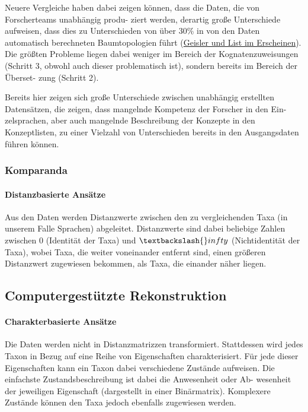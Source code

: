 Neuere Vergleiche haben dabei zeigen können, dass die Daten, die von
Forscherteams unabhängig produ- ziert werden, derartig große
Unterschiede aufweisen, dass dies zu Unterschieden von über 30\% in von
den Daten automatisch berechneten Baumtopologien führt
(\href{http://lingulist.de/jump.php?paper=Geisler2014\&href=documents/beautiful_trees.pdf}{Geisler
und List im Erscheinen}). Die größten Probleme liegen dabei weniger im
Bereich der Kognatenzuweisungen (Schritt 3, obwohl auch dieser
problematisch ist), sondern bereits im Bereich der Überset- zung
(Schritt 2).





Bereits hier zeigen sich große Unterschiede zwischen unabhängig
erstellten Datensätzen, die zeigen, dass mangelnde Kompetenz der
Forscher in den Ein- zelsprachen, aber auch mangelnde Beschreibung der
Konzepte in den Konzeptlisten, zu einer Vielzahl von Unterschieden
bereits in den Ausgangsdaten führen können.



\subsubsection{Komparanda}

\paragraph{Distanzbasierte Ansätze}

Aus den Daten werden Distanzwerte zwischen den zu vergleichenden Taxa
(in unserem Falle Sprachen) abgeleitet. Distanzwerte sind dabei
beliebige Zahlen zwischen $0$ (Identität der Taxa) und
$\textbackslash{}infty$ (Nichtidentität der Taxa), wobei Taxa, die
weiter voneinander entfernt sind, einen größeren Distanzwert zugewiesen
bekommen, als Taxa, die einander näher liegen.

\subsection{Computergestützte Rekonstruktion}


\paragraph{Charakterbasierte Ansätze}

Die Daten werden nicht in Distanzmatrizzen transformiert. Stattdessen
wird jedes Taxon in Bezug auf eine Reihe von Eigenschaften
charakterisiert. Für jede dieser Eigenschaften kann ein Taxon dabei
verschiedene Zustände aufweisen. Die einfachste Zustandsbeschreibung ist
dabei die Anwesenheit oder Ab- wesenheit der jeweiligen Eigenschaft
(dargestellt in einer Binärmatrix). Komplexere Zustände können den Taxa
jedoch ebenfalls zugewiesen werden.




